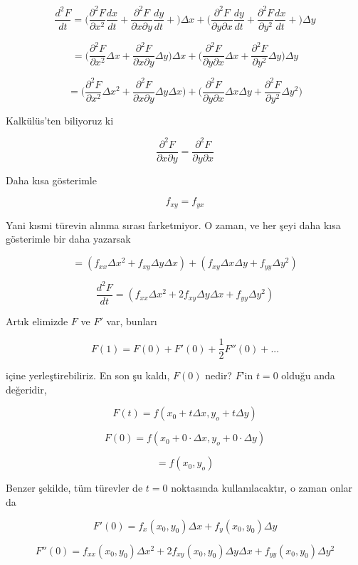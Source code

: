 \documentclass[12pt,fleqn]{article}\usepackage{../../common}
\begin{document}
$$ \frac{d^2F}{dt} =
\bigg(
\frac{\partial ^2 F}{\partial x^2}\frac{dx}{dt} + 
\frac{\partial ^2 F}{\partial x \partial y}\frac{dy}{dt} + 
\bigg) \Delta x +
\bigg(
\frac{\partial ^2 F}{\partial y \partial x}\frac{dy}{dt} + 
\frac{\partial ^2 F}{\partial y^2}\frac{dx}{dt} + 
\bigg) \Delta y 
$$

$$ =
\bigg(
\frac{\partial ^2 F}{\partial x^2}\Delta x + 
\frac{\partial ^2 F}{\partial x \partial y}\Delta y 
\bigg) \Delta x +
\bigg(
\frac{\partial ^2 F}{\partial y \partial x}\Delta x + 
\frac{\partial ^2 F}{\partial y^2}\Delta y 
\bigg) \Delta y 
 $$

$$ =
\bigg(
\frac{\partial ^2 F}{\partial x^2}\Delta x^2 + 
\frac{\partial ^2 F}{\partial x \partial y}\Delta y \Delta x
\bigg) +
\bigg(
\frac{\partial ^2 F}{\partial y \partial x}\Delta x \Delta y + 
\frac{\partial ^2 F}{\partial y^2}\Delta y^2
\bigg) 
 $$

Kalkülüs'ten biliyoruz ki 

$$ 
\frac{\partial ^2 F}{\partial x \partial y} = 
\frac{\partial ^2 F}{\partial y \partial x} 
 $$

Daha kısa gösterimle

$$ f_{xy} = f_{yx} $$

Yani kısmi türevin alınma sırası farketmiyor. O zaman, ve her şeyi daha
kısa gösterimle bir daha yazarsak

$$ =
(f_{xx}\Delta x^2 + f_{xy}\Delta y \Delta x ) +
(f_{xy}\Delta x \Delta y + f_{yy}\Delta y^2 )
 $$

$$
\frac{d^2F}{dt}  =
(f_{xx}\Delta x^2 + 2f_{xy}\Delta y \Delta x + f_{yy}\Delta y^2 )
 $$

Artık elimizde $F$ ve $F'$ var, bunları 

$$ F(1) = F(0) + F'(0) + \frac{1}{2}F''(0) + ... $$

içine yerleştirebiliriz. En son şu kaldı, $F(0)$ nedir? $F$'in $t=0$ olduğu
anda değeridir, 

$$ F(t) = f(x_0 + t\Delta x, y_o + t\Delta y) $$

$$ F(0) = f(x_0 + 0 \cdot \Delta x, y_o + 0 \cdot \Delta y) $$

$$ = f(x_0 , y_o) $$

Benzer şekilde, tüm türevler de $t=0$ noktasında kullanılacaktır, o zaman
onlar da

$$ F'(0) = f_x(x_0,y_0) \Delta x + f_y(x_0,y_0) \Delta y $$

$$ F''(0) =  
f_{xx}(x_0,y_0)\Delta x^2 + 2f_{xy}(x_0,y_0)\Delta y \Delta x + 
f_{yy}(x_0,y_0)\Delta y^2 
$$
\end{document}
